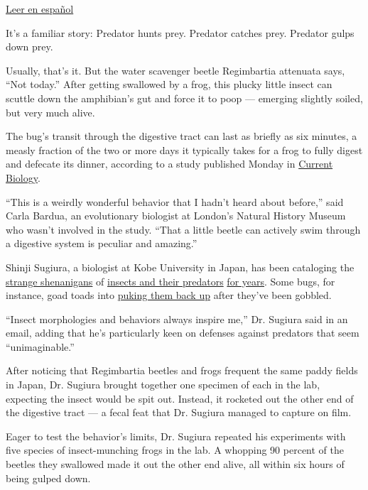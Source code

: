 \href{https://www.nytimes3xbfgragh.onion/es/2020/08/04/espanol/ciencia-y-tecnologia/escarabajo-excremento-rana.html}{Leer
en español}

It's a familiar story: Predator hunts prey. Predator catches prey.
Predator gulps down prey.

Usually, that's it. But the water scavenger beetle Regimbartia attenuata
says, ``Not today.'' After getting swallowed by a frog, this plucky
little insect can scuttle down the amphibian's gut and force it to poop
--- emerging slightly soiled, but very much alive.

The bug's transit through the digestive tract can last as briefly as six
minutes, a measly fraction of the two or more days it typically takes
for a frog to fully digest and defecate its dinner, according to a study
published Monday in
\href{http://dx.doi.org/10.1016/j.cub.2020.06.026}{Current Biology}.

``This is a weirdly wonderful behavior that I hadn't heard about
before,'' said Carla Bardua, an evolutionary biologist at London's
Natural History Museum who wasn't involved in the study. ``That a little
beetle can actively swim through a digestive system is peculiar and
amazing.''

Shinji Sugiura, a biologist at Kobe University in Japan, has been
cataloging the
\href{https://royalsocietypublishing.org/doi/10.1098/rsbl.2017.0647}{strange
shenanigans} of \href{https://peerj.com/articles/5942/}{insects and
their predators}
\href{https://onlinelibrary.wiley.com/doi/abs/10.1111/ens.12423}{for
years}. Some bugs, for instance, goad toads into
\href{https://www.nytimes3xbfgragh.onion/2018/02/06/science/bombardier-beetle-toad-vomit.html}{puking
them back up} after they've been gobbled.

``Insect morphologies and behaviors always inspire me,'' Dr. Sugiura
said in an email, adding that he's particularly keen on defenses against
predators that seem ``unimaginable.''

After noticing that Regimbartia beetles and frogs frequent the same
paddy fields in Japan, Dr. Sugiura brought together one specimen of each
in the lab, expecting the insect would be spit out. Instead, it rocketed
out the other end of the digestive tract --- a fecal feat that Dr.
Sugiura managed to capture on film.

Eager to test the behavior's limits, Dr. Sugiura repeated his
experiments with five species of insect-munching frogs in the lab. A
whopping 90 percent of the beetles they swallowed made it out the other
end alive, all within six hours of being gulped down.

